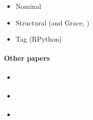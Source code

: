 
\begin{itemize}
    \item Nominal \cite{Muehlboeck2017}
    \item Structural \cite{Richards2017} (and Grace, \cite{Boyland2014})
    \item Tag (RPython) \cite{Greenman2017}
\end{itemize}

\paragraph{Other papers}


\begin{itemize}
    \item \cite{Bloom2009}
    \item \cite{Castagna2017}
    \item \cite{Stulova2016}
\end{itemize}
